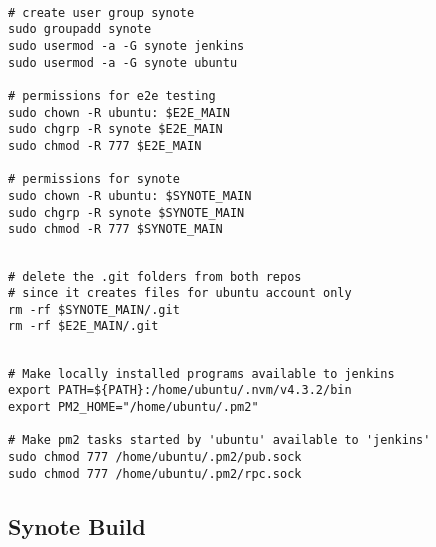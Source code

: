 \begin{listing}[H]
\begin{verbatim}

# create user group synote
sudo groupadd synote
sudo usermod -a -G synote jenkins
sudo usermod -a -G synote ubuntu

# permissions for e2e testing
sudo chown -R ubuntu: $E2E_MAIN
sudo chgrp -R synote $E2E_MAIN
sudo chmod -R 777 $E2E_MAIN

# permissions for synote
sudo chown -R ubuntu: $SYNOTE_MAIN
sudo chgrp -R synote $SYNOTE_MAIN
sudo chmod -R 777 $SYNOTE_MAIN

\end{verbatim}
\label{lst:deployment-folder-permissions}
\end{listing}

\begin{listing}[H]
\begin{verbatim}

# delete the .git folders from both repos
# since it creates files for ubuntu account only
rm -rf $SYNOTE_MAIN/.git
rm -rf $E2E_MAIN/.git

\end{verbatim}
\label{lst:deleting-git-folders}
\end{listing}

\begin{listing}[H]
\begin{verbatim}

# Make locally installed programs available to jenkins
export PATH=${PATH}:/home/ubuntu/.nvm/v4.3.2/bin
export PM2_HOME="/home/ubuntu/.pm2"

# Make pm2 tasks started by 'ubuntu' available to 'jenkins'
sudo chmod 777 /home/ubuntu/.pm2/pub.sock
sudo chmod 777 /home/ubuntu/.pm2/rpc.sock

\end{verbatim}
\label{lst:jenkins-pm2-configuration}
\end{listing}

\subsection{Synote Build}
\label{subsec:synote-build}

